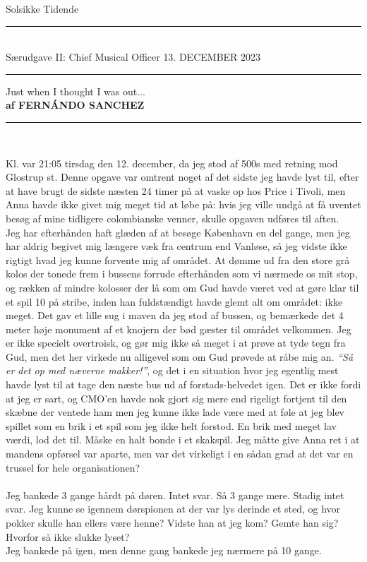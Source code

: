 \documentclass[danish]{article}
\def\papername{Solsikke Tidende}
\def\paperlocation{København}
\renewcommand{\maketitle}{
  \thispagestyle{empty}
  \vspace*{-40pt}
  \begin{center}
  \hfill
  {\textgoth
   {\huge 
     \usefont{LYG}{bigygoth}{m}{n} \papername
   }
  }\hfill%
  \raisebox{12pt}{
   \textbf{
    \footnotesize 
    \paperlocation
   }
  }\\
  \vspace*{0.1in}
  \rule[0pt]{\textwidth}{0.5pt}\\
  {\small 
     Særudgave II: Chief Musical Officer
   } \hfill 
   \MakeUppercase{\small  13. december 2023} 
   \hfill {\small }\\
  \rule[6pt]{\textwidth}{1.2pt}
  \end{center}
  \pagestyle{plain}
}
\newcommand\byline[2]{
  {\fontfamily{lmdh}\selectfont
  \begin{center} #1 \\%
  {\footnotesize\bf af \MakeUppercase{#2}} \\ %
  \rule[3pt]{0.4\hsize}{0.5pt}\\ \end{center} \par
  }
}
\begin{document}
\maketitle
{}\selectfont

\begin{multicols}{2}
\byline{Just when I thought I was out...}{Fernándo Sanchez}

Kl. var 21:05 tirsdag den 12. december, da jeg stod af 500s med retning mod Glostrup st. Denne opgave var omtrent noget af det sidste jeg havde lyst til, efter at have brugt de sidste næsten 24 timer på at vaske op hos Price i Tivoli, men Anna havde ikke givet mig meget tid at løbe på: hvis jeg ville undgå at få uventet besøg af mine tidligere colombianske venner, skulle opgaven udføres til aften.\\
Jeg har efterhånden haft glæden af at besøge København en del gange, men jeg har aldrig begivet mig længere væk fra centrum end Vanløse, så jeg vidste ikke rigtigt hvad jeg kunne forvente mig af området. At dømme ud fra den store grå kolos der tonede frem i bussens forrude efterhånden som vi nærmede os mit stop, og rækken af mindre kolosser der lå som om Gud havde været ved at gøre klar til et spil 10 på stribe, inden han fuldstændigt havde glemt alt om området: ikke meget. Det gav et lille sug i maven da jeg stod af bussen, og bemærkede det 4 meter høje monument af et knojern der bød gæster til området velkommen. Jeg er ikke specielt overtroisk, og gør mig ikke så meget i at prøve at tyde tegn fra Gud, men det her virkede nu alligevel som om Gud prøvede at råbe mig an. \textit{``Så er det op med næverne makker!''}, og det i en situation hvor jeg egentlig mest havde lyst til at tage den næste bus ud af forstads-helvedet igen. Det er ikke fordi at jeg er sart, og CMO'en havde nok gjort sig mere end rigeligt fortjent til den skæbne der ventede ham men jeg kunne ikke lade være med at føle at jeg blev spillet som en brik i et spil som jeg ikke helt forstod. En brik med meget lav værdi, lod det til. Måske en halt bonde i et skakspil. Jeg måtte give Anna ret i at mandens opførsel var aparte, men var det virkeligt i en sådan grad at det var en trussel for hele organisationen?

\paragraph{}
Jeg bankede 3 gange hårdt på døren. Intet svar. Så 3 gange mere. Stadig intet svar. Jeg kunne se igennem dørspionen at der var lys derinde et sted, og hvor pokker skulle han ellers være henne? Vidste han at jeg kom? Gemte han sig? Hvorfor så ikke slukke lyset?\\
Jeg bankede på igen, men denne gang bankede jeg nærmere på 10 gange.\\


\end{multicols}
\end{document}
